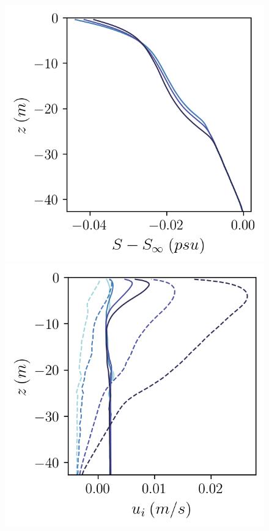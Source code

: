\documentclass[draft]{styles/agujournal2019}
\begin{document}
\begin{figure}[h!]
\begin{minipage}{0.33\textwidth}
    \end{minipage}%
    \begin{minipage}{0.33\textwidth}
        \includegraphics[trim={0 0cm 0 0},clip, width=\textwidth]{Figures/sa_cmp_dslope_43h_tav13h_z_profile.png}
    \end{minipage}%
    \begin{minipage}{0.33\textwidth}
        \includegraphics[trim={0 0cm 0 0},clip, width=\textwidth]{Figures/velocity_cmp_dslope_43h_tav13h_z_profile.png}

\end{minipage}
\end{figure}
\end{document}
